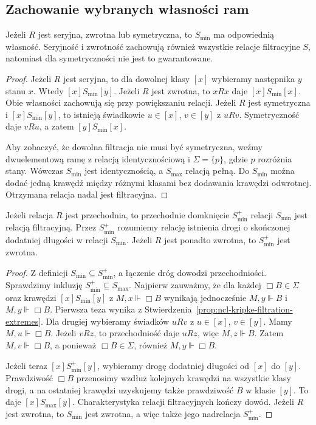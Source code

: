 \subsection{Zachowanie wybranych własności ram}

\begin{stwierdzenie}
\label{prop:ncl-kripke-filtration-basic-properties}
Jeżeli $R$ jest seryjna, zwrotna lub symetryczna,
to $S_{\min}$ ma odpowiednią własność.
Seryjność i zwrotność zachowują również
wszystkie relacje filtracyjne $S$,
natomiast dla symetryczności nie jest to
gwarantowane.
\end{stwierdzenie}
\begin{proof}
Jeżeli $R$ jest seryjna, to dla dowolnej
klasy $[x]$ wybieramy następnika $y$ stanu
$x$. Wtedy $[x]S_{\min}[y]$.
Jeżeli $R$ jest zwrotna, to $xRx$ daje
$[x]S_{\min}[x]$.
Obie własności zachowują się przy
powiększaniu relacji.
Jeżeli $R$ jest symetryczna i
$[x]S_{\min}[y]$, to istnieją świadkowie
$u\in[x]$, $v\in[y]$ z $uRv$.
Symetryczność daje $vRu$, a zatem
$[y]S_{\min}[x]$.

Aby zobaczyć, że dowolna filtracja nie
musi być symetryczna, weźmy dwuelementową
ramę z relacją identycznościową i
$\Sigma=\{p\}$, gdzie $p$ rozróżnia stany.
Wówczas $S_{\min}$ jest identycznością,
a $S_{\max}$ relacją pełną. Do $S_{\min}$
można dodać jedną krawędź między różnymi
klasami bez dodawania krawędzi odwrotnej.
Otrzymana relacja nadal jest filtracyjna.
\end{proof}

\begin{lemat}
\label{lem:ncl-kripke-transitive-filtration}
Jeżeli relacja $R$ jest przechodnia,
to przechodnie domknięcie $S_{\min}^{+}$
relacji $S_{\min}$ jest relacją filtracyjną.
Przez $S_{\min}^{+}$ rozumiemy relację
istnienia drogi o skończonej dodatniej długości
w relacji $S_{\min}$.
Jeżeli $R$ jest ponadto zwrotna, to
$S_{\min}^{+}$ jest zwrotna.
\end{lemat}
\begin{proof}
Z definicji $S_{\min}\subseteq S_{\min}^{+}$,
a łączenie dróg dowodzi przechodniości.
Sprawdzimy inkluzję $S_{\min}^{+}\subseteq S_{\max}$.
Najpierw zauważmy, że dla każdej
$\Box B\in\Sigma$ oraz krawędzi
$[x]S_{\min}[y]$ z $M,x\Vdash\Box B$
wynikają jednocześnie $M,y\Vdash B$
i $M,y\Vdash\Box B$.
Pierwsza teza wynika z
Stwierdzenia~\ref{prop:ncl-kripke-filtration-extremes}.
Dla drugiej wybieramy świadków $uRv$
z $u\in[x]$, $v\in[y]$.
Mamy $M,u\Vdash\Box B$.
Jeżeli $vRz$, to przechodniość daje $uRz$,
więc $M,z\Vdash B$.
Zatem $M,v\Vdash\Box B$, a ponieważ
$\Box B\in\Sigma$, również $M,y\Vdash\Box B$.

Jeżeli teraz $[x]S_{\min}^{+}[y]$, wybieramy
drogę dodatniej długości od $[x]$ do $[y]$.
Prawdziwość $\Box B$ przenosimy wzdłuż
kolejnych krawędzi na wszystkie klasy
drogi, a na ostatniej krawędzi uzyskujemy
także prawdziwość $B$ w klasie $[y]$.
To daje $[x]S_{\max}[y]$.
Charakterystyka relacji filtracyjnych
kończy dowód. Jeżeli $R$ jest zwrotna,
to $S_{\min}$ jest zwrotna, a więc także
jego nadrelacja $S_{\min}^{+}$.
\end{proof}

